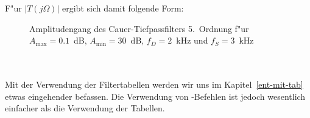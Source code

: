 \clearpage
F"ur $|T(j\Omega)|$ ergibt sich damit folgende Form:
\begin{figure}[!htb] %
\begin{center}
  \caption{Amplitudengang des Cauer-Tiefpassfilters 5.~Ordnung f"ur $A_{\max}=0.1$~dB, $A_{\min}=30$~dB, $f_{D}=2$~kHz und $f_{S}=3$~kHz}
\end{center}
\vspace*{-6mm} 
\end{figure}\\~\\
\nit Mit der Verwendung der Filtertabellen werden wir uns im 
Kapitel~\ref{ent-mit-tab} etwas eingehender befassen. Die Verwendung von \matlogo-Befehlen
ist jedoch wesentlich einfacher als die Verwendung der Tabellen.






\clearpage
